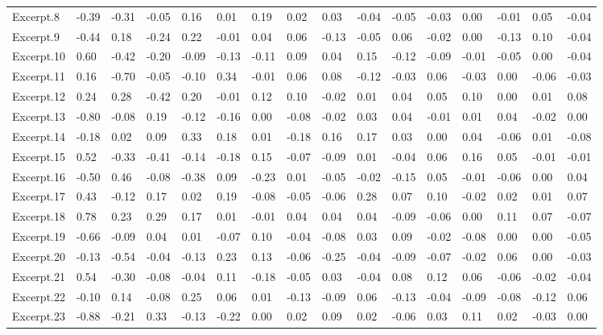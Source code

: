 \documentclass[
]{article}
\newenvironment{lltable}{\begin{landscape}\begin{center}\begin{ThreePartTable}}{\end{ThreePartTable}\end{center}\end{landscape}}
\begin{document}
\begin{lltable}
{\begin{longtable}{llllllllllllllll}
Excerpt.8 & -0.39 & -0.31 & -0.05 & 0.16 & 0.01 & 0.19 & 0.02 & 0.03 & -0.04 & -0.05 & -0.03 & 0.00 & -0.01 & 0.05 & -0.04\\
Excerpt.9 & -0.44 & 0.18 & -0.24 & 0.22 & -0.01 & 0.04 & 0.06 & -0.13 & -0.05 & 0.06 & -0.02 & 0.00 & -0.13 & 0.10 & -0.04\\
Excerpt.10 & 0.60 & -0.42 & -0.20 & -0.09 & -0.13 & -0.11 & 0.09 & 0.04 & 0.15 & -0.12 & -0.09 & -0.01 & -0.05 & 0.00 & -0.04\\
Excerpt.11 & 0.16 & -0.70 & -0.05 & -0.10 & 0.34 & -0.01 & 0.06 & 0.08 & -0.12 & -0.03 & 0.06 & -0.03 & 0.00 & -0.06 & -0.03\\
Excerpt.12 & 0.24 & 0.28 & -0.42 & 0.20 & -0.01 & 0.12 & 0.10 & -0.02 & 0.01 & 0.04 & 0.05 & 0.10 & 0.00 & 0.01 & 0.08\\
Excerpt.13 & -0.80 & -0.08 & 0.19 & -0.12 & -0.16 & 0.00 & -0.08 & -0.02 & 0.03 & 0.04 & -0.01 & 0.01 & 0.04 & -0.02 & 0.00\\
Excerpt.14 & -0.18 & 0.02 & 0.09 & 0.33 & 0.18 & 0.01 & -0.18 & 0.16 & 0.17 & 0.03 & 0.00 & 0.04 & -0.06 & 0.01 & -0.08\\
Excerpt.15 & 0.52 & -0.33 & -0.41 & -0.14 & -0.18 & 0.15 & -0.07 & -0.09 & 0.01 & -0.04 & 0.06 & 0.16 & 0.05 & -0.01 & -0.01\\
Excerpt.16 & -0.50 & 0.46 & -0.08 & -0.38 & 0.09 & -0.23 & 0.01 & -0.05 & -0.02 & -0.15 & 0.05 & -0.01 & -0.06 & 0.00 & 0.04\\
Excerpt.17 & 0.43 & -0.12 & 0.17 & 0.02 & 0.19 & -0.08 & -0.05 & -0.06 & 0.28 & 0.07 & 0.10 & -0.02 & 0.02 & 0.01 & 0.07\\
Excerpt.18 & 0.78 & 0.23 & 0.29 & 0.17 & 0.01 & -0.01 & 0.04 & 0.04 & 0.04 & -0.09 & -0.06 & 0.00 & 0.11 & 0.07 & -0.07\\
Excerpt.19 & -0.66 & -0.09 & 0.04 & 0.01 & -0.07 & 0.10 & -0.04 & -0.08 & 0.03 & 0.09 & -0.02 & -0.08 & 0.00 & 0.00 & -0.05\\
Excerpt.20 & -0.13 & -0.54 & -0.04 & -0.13 & 0.23 & 0.13 & -0.06 & -0.25 & -0.04 & -0.09 & -0.07 & -0.02 & 0.06 & 0.00 & -0.03\\
Excerpt.21 & 0.54 & -0.30 & -0.08 & -0.04 & 0.11 & -0.18 & -0.05 & 0.03 & -0.04 & 0.08 & 0.12 & 0.06 & -0.06 & -0.02 & -0.04\\
Excerpt.22 & -0.10 & 0.14 & -0.08 & 0.25 & 0.06 & 0.01 & -0.13 & -0.09 & 0.06 & -0.13 & -0.04 & -0.09 & -0.08 & -0.12 & 0.06\\
Excerpt.23 & -0.88 & -0.21 & 0.33 & -0.13 & -0.22 & 0.00 & 0.02 & 0.09 & 0.02 & -0.06 & 0.03 & 0.11 & 0.02 & -0.03 & 0.00\\

\end{longtable}}
\end{lltable}
\end{document}
